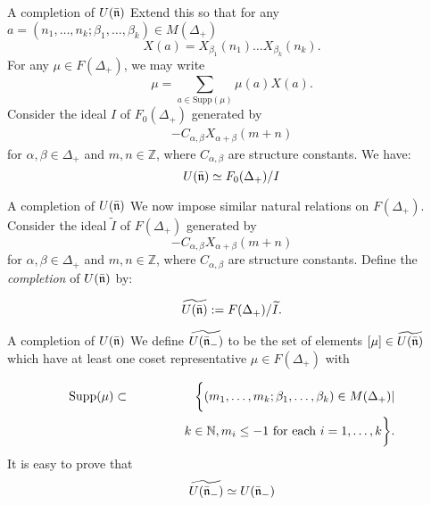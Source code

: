 \documentclass{beamer}
\begin{document}
\begin{frame}{A completion of $U(\bar{\frak{n}})$}
 Extend this so that for any $a = (n_1,\dots,n_k;\beta_1,\dots,\beta_k) \in M(\Delta_+)$
$$
X(a) = X_{\beta_1}(n_1)\dots X_{\beta_k}(n_k).
$$
\pause
For any $\mu \in F(\Delta_+)$, we may write
$$
\mu = \sum_{a \in \mbox{Supp}(\mu)} \mu(a)X(a).
$$
\pause
Consider the ideal $I$ of $F_0(\Delta_+)$ generated by
\begin{eqnarray*}
 [X_\alpha(n),X_\beta(m)] - C_{\alpha,\beta}X_{\alpha + \beta}(m+n)
\end{eqnarray*}
for $\alpha, \beta \in \Delta_+$ and $m,n \in \mathbb{Z}$, where
$C_{\alpha,\beta}$ are structure constants.  We
have:
$$U(\bar{\frak{n}}) \simeq F_0(\Delta_+)/I$$

\end{frame}

\begin{frame}{A completion of $U(\bar{\frak{n}})$}
 We now impose similar natural relations on $F(\Delta_+)$. Consider the ideal
$\widetilde{I}$ of $F(\Delta_+)$ generated by
\begin{equation*}
 [X_\alpha(n),X_\beta(m)] - C_{\alpha,\beta}X_{\alpha + \beta}(m+n)
\end{equation*}
for $\alpha, \beta \in \Delta_+$ and $m,n \in \mathbb{Z}$,
where $C_{\alpha,\beta}$ are structure constants.
 Define the {\em completion} of $U(\bar{\frak{n}})$ by:
 
 \begin{equation} \label{completion}
  \widetilde{U(\bar{\frak{n}})} := F(\Delta_+) / \widetilde{I}.
 \end{equation}

 

\end{frame}
\begin{frame}{A completion of $U(\bar{\frak{n}})$}
We define
$ \widetilde{U(\bar{\frak{n}}_{-})} 
$
to be the set of elements $[\mu] \in \widetilde{U(\bar{\frak{n}})}$ which have at least one coset representative
$\mu \in F(\Delta_+)$ with

\begin{eqnarray*}
\mathrm{Supp}(\mu) \subset && \biggl\{ (m_1,\dots,m_k; \beta_1, \dots, \beta_k) \in M(\Delta_+) |\\ &&\hspace{.5in} k
\in \mathbb{N}, m_i \le -1 \mathrm{ \ for \ each \ }i =1,\dots,k \biggr\}.
\end{eqnarray*}
It is easy to prove that 
$$
\widetilde{U(\bar{\frak{n}}_{-})} \simeq U(\bar{\frak{n}}_{-})
$$
\end{frame}
\end{document}
